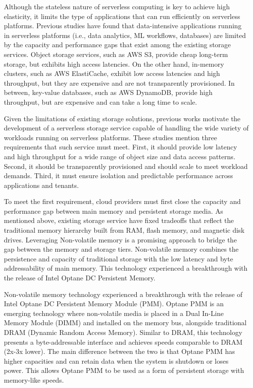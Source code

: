 Although the stateless nature of serverless computing is key to achieve high elasticity, it limits the type of applications that can run efficiently on serverless platforms. Previous studies \cite{jonas2019cloud,pu2019shuffling} have found that data-intensive applications running in serverless platforms (i.e., data analytics, ML workflows, databases) are limited by the capacity and performance gaps that exist among the existing storage services. Object storage services, such as AWS S3, provide cheap long-term storage, but exhibits high access latencies. On the other hand, in-memory clusters, such as AWS ElastiCache, exhibit low access latencies and high throughput, but they are expensive and are not transparently provisioned. In between, key-value databases, such as AWS DynamoDB, provide high throughput, but are expensive and can take a long time to scale.

Given the limitations of existing storage solutions, previous works motivate the development of a serverless storage service capable of handling the wide variety of workloads running on serverless platforms. These studies mention three requirements that such service must meet. First, it should provide low latency and high throughput for a wide range of object size and data access patterns. Second, it should be transparently provisioned and should scale to meet workload demands. Third, it must ensure isolation and predictable performance across applications and tenants.

To meet the first requirement, cloud providers must first close the capacity and performance gap between main memory and persistent storage media. As mentioned above, existing storage service have fixed tradeoffs that reflect the traditional memory hierarchy built from RAM, flash memory, and magnetic disk drives. Leveraging Non-volatile memory is a promising approach to bridge the gap between the memory and storage tiers. Non-volatile memory combines the persistence and capacity of traditional storage with the low latency and byte addressability of main memory. This technology experienced a breakthrough with the release of Intel Optane DC Persistent Memory.

Non-volatile memory technology experienced a breakthrough with the release of Intel Optane DC Persistent Memory Module (PMM). Optane PMM is an emerging technology where non-volatile media is placed in a Dual In-Line Memory Module (DIMM) and installed on the memory bus, alongside traditional DRAM (Dynamic Random Access Memory). Similar to DRAM, this technology presents a byte-addressable interface and achieves speeds comparable to DRAM (2x-3x lower). The main difference between the two is that Optane PMM has higher capacities and can retain data when the system is shutdown or loses power. This allows Optane PMM to be used as a form of persistent storage with memory-like speeds.

